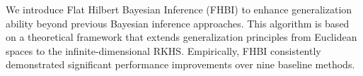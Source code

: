 We introduce Flat Hilbert Bayesian Inference (FHBI) to enhance generalization ability beyond previous Bayesian inference approaches. This algorithm is based on a theoretical framework that extends generalization principles from Euclidean spaces to the infinite-dimensional RKHS. Empirically, FHBI consistently demonstrated significant performance improvements over nine baseline methods.
